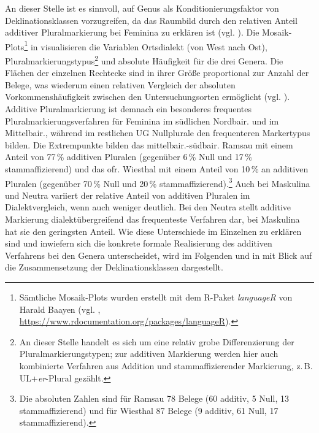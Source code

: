 An dieser Stelle ist es sinnvoll, auf Genus als Konditionierungsfaktor von Deklinationsklassen vorzugreifen, da das Raumbild durch den relativen Anteil additiver Pluralmarkierung bei Feminina zu erklären ist (vgl. ). Die Mosaik-Plots\footnote{Sämtliche Mosaik-Plots wurden erstellt mit dem R-Paket \textit{languageR} von Harald Baayen (vgl. \citealt{Baayen2015}, \url{https://www.rdocumentation.org/packages/languageR}).} in  visualisieren die Variablen Ortsdialekt (von West nach Ost), Pluralmarkierungstypus\footnote{An dieser Stelle handelt es sich um eine relativ grobe Differenzierung der Pluralmarkierungstypen; zur additiven Markierung werden hier auch kombinierte Verfahren aus Addition und stammaffizierender Markierung, z.\,B. UL+\textit{er}{}-Plural gezählt.}  und absolute Häufigkeit für die drei Genera. Die Flächen der einzelnen Rechtecke sind in ihrer Größe proportional zur Anzahl der Belege, was wiederum einen relativen Vergleich der absoluten Vorkommenshäufigkeit zwischen den Untersuchungsorten ermöglicht (vgl. \citealt[33]{Baayen2015}). Additive Pluralmarkierung
ist demnach ein besonderes frequentes Pluralmarkierungsverfahren für Feminina im südlichen Nordbair. und im Mittelbair., während im restlichen UG Nullplurale den frequenteren Markertypus bilden. Die Extrempunkte bilden das mittelbair.-südbair. Ramsau mit einem Anteil von 77\,\% additiven Pluralen (gegenüber 6\,\% Null und 17\,\% stammaffizierend) und das ofr. Wiesthal mit einem Anteil von 10\,\% an additiven Pluralen (gegenüber 70\,\% Null und 20\,\% stammaffizierend).\footnote{Die absoluten Zahlen sind für Ramsau 78 Belege (60 additiv, 5 Null, 13 stammaffizierend) und für Wiesthal 87 Belege (9 additiv, 61 Null, 17 stammaffizierend).} Auch bei Maskulina und Neutra variiert der relative Anteil von additiven Pluralen im Dialektvergleich, wenn auch weniger deutlich. Bei den Neutra stellt additive Markierung dialektübergreifend das frequenteste Verfahren dar, bei Maskulina hat sie den geringsten Anteil. Wie diese Unterschiede im Einzelnen zu erklären sind und inwiefern sich die konkrete formale Realisierung des additiven Verfahrens bei den Genera unterscheidet, wird im Folgenden und in  mit Blick auf die Zusammensetzung der Deklinationsklassen dargestellt.


